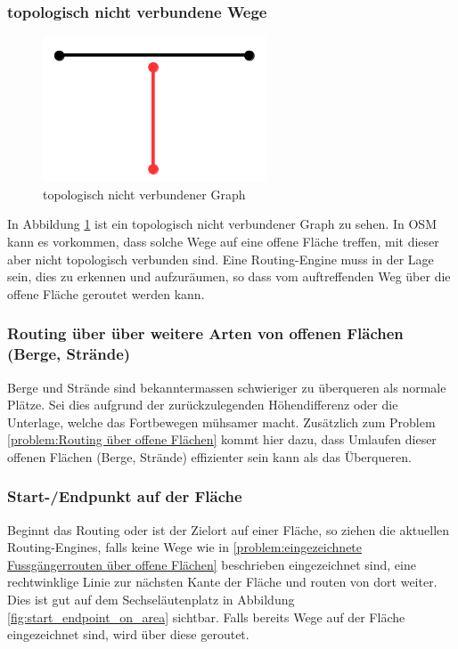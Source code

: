 \subsubsection{topologisch nicht verbundene Wege}
\label{problem:topologisch nicht verbundene Wege}

\begin{figure}[ht]
\centering
\includegraphics[width=0.5\linewidth]{technicalreport/img/topologisch_nicht_verbundener_graph}
\caption[topologisch nicht verbundener Graph]{topologisch nicht verbundener Graph}
\label{fig:topologisch_nicht_verbundener_graph}
\end{figure}

In Abbildung \ref{fig:topologisch_nicht_verbundener_graph} ist ein topologisch nicht verbundener Graph zu sehen. In \ac{OSM} kann es vorkommen, dass solche Wege auf eine offene Fläche treffen, mit dieser aber nicht topologisch verbunden sind. Eine Routing-Engine muss in der Lage sein, dies zu erkennen und aufzuräumen, so dass vom auftreffenden Weg über die offene Fläche geroutet werden kann.

\subsubsection{Routing über über weitere Arten von offenen Flächen (Berge, Strände)}
\label{problem:Routing über über weitere Arten von offenen Flächen (Berge, Strände)}
Berge und Strände sind bekanntermassen schwieriger zu überqueren als normale Plätze. Sei dies aufgrund der zurückzulegenden Höhendifferenz oder die Unterlage, welche das Fortbewegen mühsamer macht. Zusätzlich zum Problem \ref{problem:Routing über offene Flächen} kommt hier dazu, dass Umlaufen dieser offenen Flächen (Berge, Strände) effizienter sein kann als das Überqueren.

\subsubsection{Start-/Endpunkt auf der Fläche}
\label{problem:Start-/Endpunkt auf der Fläche}
Beginnt das Routing oder ist der Zielort auf einer Fläche, so ziehen die aktuellen Routing-Engines, falls keine Wege wie in \ref{problem:eingezeichnete Fussgängerrouten über offene Flächen} beschrieben eingezeichnet sind, eine rechtwinklige Linie zur nächsten Kante der Fläche und routen von dort weiter. Dies ist gut auf dem Sechseläutenplatz in Abbildung \ref{fig:start_endpoint_on_area} sichtbar. Falls bereits Wege auf der Fläche eingezeichnet sind, wird über diese geroutet.

